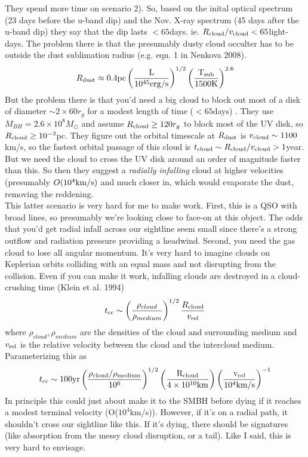 \documentclass[12pt]{article}
\begin{document}
They spend more time on scenario 2). So, based on the inital optical spectrum (23 days before the u-band dip) and the Nov. X-ray spectrum (45 days after the u-band dip) they say that the dip lasts $<65$days. ie. $R_{\rm cloud}/v_{\rm cloud} <65$light-days. The problem there is that the presumably dusty cloud occulter has to be outside the dust sublimation radius (e.g. eqn. 1 in Nenkova 2008).
\begin{equation}
R_{\rm dust} \approx 0.4\rm{pc}\left( \frac{L}{10^{45}\rm{erg/s}}\right)^{1/2}\left(\frac{T_{\rm sub}}{1500\rm{K}}\right)^{2.6}
\end{equation}
But the problem there is that you'd need a big cloud to block out most of a disk of diameter $\sim 2 \times 60r_{g}$ for a modest length of time ($<65$days) . They use $M_{BH}=2.6 \times 10^{8}M_{\odot}$ and assume $R_{\rm cloud} \geq 120r_{g}$ to block most of the UV disk, so $R_{\rm cloud} \geq 10^{-3}$pc. They figure out the orbital timescale at $R_{\rm dust}$ is $v_{\rm cloud} \sim 1100$km/s, so the fastest orbital passage of this cloud is $t_{\rm cloud} \sim R_{\rm cloud}/v_{\rm cloud} >1$year. But we need the cloud to cross the UV disk around an order of magnitude faster than this. So then they suggest a \emph{radially infalling} cloud at higher velocities (presumably $O(10^{4}\rm{km/s})$ and much closer in, which would evaporate the dust, removing the reddening.\\

This latter scenario is very hard for me to make work. First, this is a QSO with broad lines, so presumably we're looking close to face-on at this object. The odds that you'd get radial infall across our sightline seem small since there's a strong outflow and radiation pressure providing a headwind. Second, you need the gas cloud to lose all angular momentum. It's very hard to imagine clouds on Keplerian orbits colliding with an equal mass and not disrupting from the collision. Even if you can make it work, infalling clouds are destroyed in a cloud-crushing time (Klein et al. 1994)
\begin{equation}
t_{\rm cc} \sim \left(\frac{\rho_{cloud}}{\rho_{medium}}\right)^{1/2} \frac{R_{\rm cloud}}{v_{\rm rel}}
\end{equation}
where $\rho_{cloud},\rho_{medium}$ are the densities of the cloud and surrounding medium and $v_{\rm rel}$ is the relative velocity between the cloud and the intercloud medium. Parameterizing this as
\begin{equation}
t_{\rm cc} \sim 100\rm{yr} \left(\frac{\rho_{cloud}/\rho_{medium}}{10^{6}}\right)^{1/2}\left(\frac{R_{\rm cloud}}{4 \times 10^{10}\rm{km}}\right) \left(\frac{v_{\rm rel}}{10^{4}\rm{km/s}}\right)^{-1}
\end{equation}
In principle this could just about make it to the SMBH before dying if it reaches a modest terminal velocity (O($10^{4}$km/s)). However, if it's on a radial path, it shouldn't cross our sightline like this. If it's dying, there should be signatures (like absorption from the messy cloud disruption, or a tail). Like I said, this is very hard to envisage.\\
\end{document}

